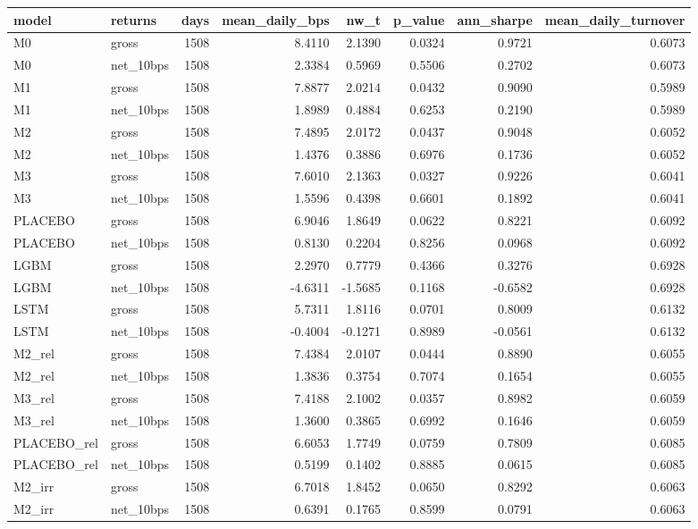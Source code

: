 \begin{tabular}{llrrrrrr}
\toprule
model & returns & days & mean\_daily\_bps & nw\_t & p\_value & ann\_sharpe & mean\_daily\_turnover \\
\midrule
M0 & gross & 1508 & 8.4110 & 2.1390 & 0.0324 & 0.9721 & 0.6073 \\
M0 & net\_10bps & 1508 & 2.3384 & 0.5969 & 0.5506 & 0.2702 & 0.6073 \\
M1 & gross & 1508 & 7.8877 & 2.0214 & 0.0432 & 0.9090 & 0.5989 \\
M1 & net\_10bps & 1508 & 1.8989 & 0.4884 & 0.6253 & 0.2190 & 0.5989 \\
M2 & gross & 1508 & 7.4895 & 2.0172 & 0.0437 & 0.9048 & 0.6052 \\
M2 & net\_10bps & 1508 & 1.4376 & 0.3886 & 0.6976 & 0.1736 & 0.6052 \\
M3 & gross & 1508 & 7.6010 & 2.1363 & 0.0327 & 0.9226 & 0.6041 \\
M3 & net\_10bps & 1508 & 1.5596 & 0.4398 & 0.6601 & 0.1892 & 0.6041 \\
PLACEBO & gross & 1508 & 6.9046 & 1.8649 & 0.0622 & 0.8221 & 0.6092 \\
PLACEBO & net\_10bps & 1508 & 0.8130 & 0.2204 & 0.8256 & 0.0968 & 0.6092 \\
LGBM & gross & 1508 & 2.2970 & 0.7779 & 0.4366 & 0.3276 & 0.6928 \\
LGBM & net\_10bps & 1508 & -4.6311 & -1.5685 & 0.1168 & -0.6582 & 0.6928 \\
LSTM & gross & 1508 & 5.7311 & 1.8116 & 0.0701 & 0.8009 & 0.6132 \\
LSTM & net\_10bps & 1508 & -0.4004 & -0.1271 & 0.8989 & -0.0561 & 0.6132 \\
M2\_rel & gross & 1508 & 7.4384 & 2.0107 & 0.0444 & 0.8890 & 0.6055 \\
M2\_rel & net\_10bps & 1508 & 1.3836 & 0.3754 & 0.7074 & 0.1654 & 0.6055 \\
M3\_rel & gross & 1508 & 7.4188 & 2.1002 & 0.0357 & 0.8982 & 0.6059 \\
M3\_rel & net\_10bps & 1508 & 1.3600 & 0.3865 & 0.6992 & 0.1646 & 0.6059 \\
PLACEBO\_rel & gross & 1508 & 6.6053 & 1.7749 & 0.0759 & 0.7809 & 0.6085 \\
PLACEBO\_rel & net\_10bps & 1508 & 0.5199 & 0.1402 & 0.8885 & 0.0615 & 0.6085 \\
M2\_irr & gross & 1508 & 6.7018 & 1.8452 & 0.0650 & 0.8292 & 0.6063 \\
M2\_irr & net\_10bps & 1508 & 0.6391 & 0.1765 & 0.8599 & 0.0791 & 0.6063 \\

\end{tabular}
